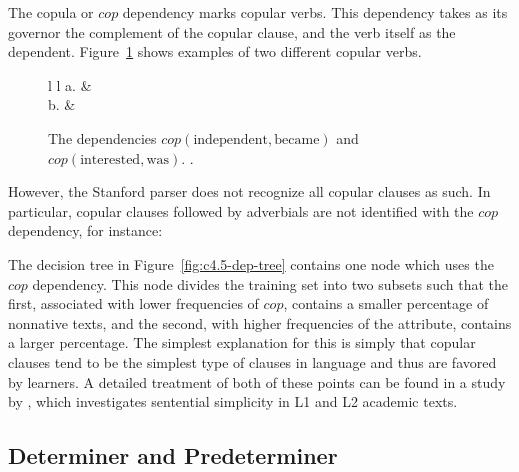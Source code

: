 \documentclass[main.tex]{subfiles}
\begin{document}
The copula or $cop$ dependency marks copular verbs. This dependency takes as its governor the complement of the copular clause, and the verb itself as the dependent. Figure~\ref{ex:cop1} shows examples of two different copular verbs.
\begin{figure}[ht]
\centering
\begin{tabular}{ l l }
a. &
\\

b. &
\\
\end{tabular}
\caption{The dependencies $cop(\text{independent},\text{became})$ and $cop(\text{interested},\text{was})$. \citep[Ch. 2.15, 2.16]{quirk:1985}.}
\label{ex:cop1}
\end{figure}
However, the Stanford parser does not recognize all copular clauses as such. In particular, copular clauses followed by adverbials are not identified with the $cop$ dependency, for instance:

The decision tree in Figure~\ref{fig:c4.5-dep-tree} contains one node which uses the $cop$ dependency. This node divides the training set into two subsets such that the first, associated with lower frequencies of $cop$, contains a smaller percentage of nonnative texts, and the second, with higher frequencies of the attribute, contains a larger percentage. The simplest explanation for this is simply that copular clauses tend to be the simplest type of clauses in language and thus are favored by learners. A detailed treatment of both of these points can be found in a study by \citet{hinkel:2003}, which investigates sentential simplicity in L1 and L2 academic texts.

\subsection{Determiner and Predeterminer}
\end{document}
